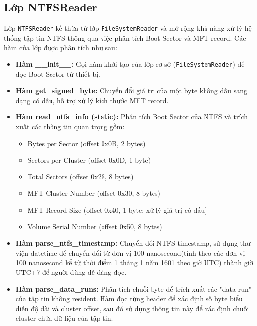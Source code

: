 \subsection{Lớp NTFSReader}

Lớp \texttt{NTFSReader} kế thừa từ lớp \texttt{FileSystemReader} và mở rộng khả năng xử lý hệ thống tập tin NTFS thông qua việc phân tích Boot Sector và MFT record. Các hàm của lớp được phân tích như sau:

\begin{itemize}
    \item \textbf{Hàm \_\_init\_\_:} Gọi hàm khởi tạo của lớp cơ sở (\texttt{FileSystemReader}) để đọc Boot Sector từ thiết bị. 
    \item \textbf{Hàm get\_signed\_byte:} Chuyển đổi giá trị của một byte không dấu sang dạng có dấu, hỗ trợ xử lý kích thước MFT record.
    \item \textbf{Hàm read\_ntfs\_info (static):} Phân tích Boot Sector của NTFS và trích xuất các thông tin quan trọng gồm:
    \begin{itemize}
        \item Bytes per Sector (offset 0x0B, 2 bytes)
        \item Sectors per Cluster (offset 0x0D, 1 byte)
        \item Total Sectors (offset 0x28, 8 bytes)
        \item MFT Cluster Number (offset 0x30, 8 bytes)
        \item MFT Record Size (offset 0x40, 1 byte; xử lý giá trị có dấu)
        \item Volume Serial Number (offset 0x50, 8 bytes)
    \end{itemize}
    \item \textbf{Hàm parse\_ntfs\_timestamp:} Chuyển đổi NTFS timestamp, sử dụng thư viện datetime để chuyển đổi từ đơn vị 100 nanosecond(tính theo các đơn vị 100 nanosecond kể từ thời điểm 1 tháng 1 năm 1601 theo giờ UTC) thành giờ UTC+7 để người dùng dễ dàng đọc.
    
    \item \textbf{Hàm parse\_data\_runs:} Phân tích chuỗi byte để trích xuất các "data run" của tập tin không resident. Hàm đọc từng header để xác định số byte biểu diễn độ dài và cluster offset, sau đó sử dụng thông tin này để xác định chuỗi cluster chứa dữ liệu của tập tin.
    

\end{itemize}
